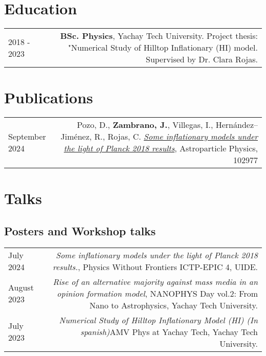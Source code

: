 \documentclass{article}
\begin{document}
\section*{Education}
\begin{tabular}{L!{\vrule}R}
	2018 - 2023 & \textbf{BSc. Physics}, Yachay Tech University. Project thesis: "Numerical Study of Hilltop Inflationary (HI) model. Supervised by Dr. Clara Rojas. \\
\end{tabular}

\section*{Publications}



\begin{tabular}{L!{\vrule}R}
    September 2024 & 
    Pozo, D., \textbf{Zambrano, J.}, Villegas, I., Hernández–Jiménez, R., Rojas, C.
    \href{https://ui.adsabs.harvard.edu/abs/2024APh...16102977P/}{\textit{Some inflationary models under the light of Planck 2018 results}},
    Astroparticle Physics, 102977 \\
\end{tabular}


\section*{Talks}
\subsection*{Posters and Workshop talks}
\begin{tabular}{L!{\vrule}R}

    July 2024 & \textit{Some inflationary models under the light of Planck 2018 results.}, Physics Without Frontiers ICTP-EPIC 4, UIDE. \\

    August 2023 & \textit{Rise of an alternative majority against mass media in an opinion formation model}, NANOPHYS Day vol.2: From Nano to Astrophysics, Yachay Tech University. \\

    July 2023 & \textit{Numerical Study of Hilltop Inflationary Model (HI) (In spanish)}AMV Phys at Yachay Tech, Yachay Tech University. \\

    

\end{tabular}
\end{document}
